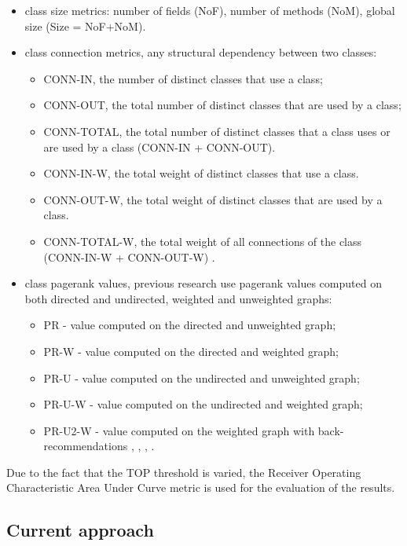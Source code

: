 \begin{itemize}
	\item class size metrics: number of fields (NoF),  number of methods (NoM), global size (Size = NoF+NoM).
	\item class connection metrics, any structural dependency between two classes:
		\begin{itemize}
			\item CONN-IN, the number of distinct classes that use a class;
			\item CONN-OUT, the total number of distinct classes that are used by a class;
			\item CONN-TOTAL, the total number of distinct classes that a class uses or are used by a class (CONN-IN + CONN-OUT).
			\item CONN-IN-W, the total weight of distinct classes that use a class. 
			\item CONN-OUT-W, the total weight of distinct classes that are used by a class. 
			\item CONN-TOTAL-W, the total weight of all connections of the class (CONN-IN-W + CONN-OUT-W) \cite{Finding-key-classes}.
		\end{itemize}
	\item class pagerank values, previous research use pagerank values computed on both directed and undirected, weighted and unweighted graphs:
		\begin{itemize}
			\item PR - value computed on the directed and unweighted graph;
			\item PR-W - value computed on the directed and weighted graph;
			\item PR-U - value computed on the undirected and unweighted graph;
			\item PR-U-W - value computed on the undirected and weighted graph;
			\item PR-U2-W - value computed on the weighted graph with back-recommendations \cite{PagerankENASE}, \cite{enase15}, \cite{Finding-key-classes}, \cite{PagerankSACI}.
		\end{itemize}
\end{itemize}


Due to the fact that the TOP threshold is varied, the Receiver Operating Characteristic Area Under Curve metric is used for the evaluation of the results.



\subsection{Current approach}
\label{subsec:key_current_approach}

